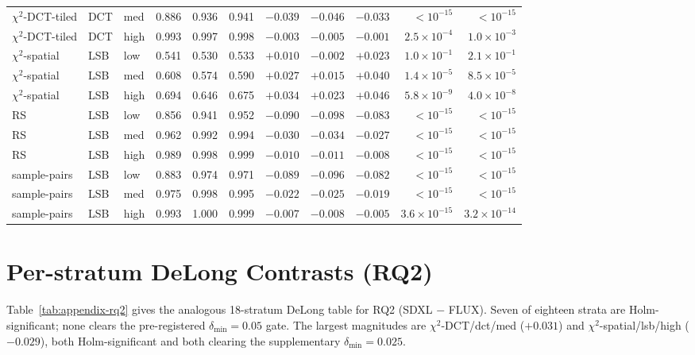 \documentclass[10pt,twocolumn,a4paper]{article}
\begin{document}
\begin{table}[h]
\begin{tabular}{@{}l l l c c c r r r r r@{}}
$\chi^2$-DCT-tiled   & DCT & med    & 0.886 & 0.936 & 0.941 & $-0.039$ & $-0.046$ & $-0.033$ & $<\!10^{-15}$           & $<\!10^{-15}$ \\
$\chi^2$-DCT-tiled   & DCT & high   & 0.993 & 0.997 & 0.998 & $-0.003$ & $-0.005$ & $-0.001$ & $2.5\!\times\!10^{-4}$ & $1.0\!\times\!10^{-3}$ \\
$\chi^2$-spatial     & LSB & low    & 0.541 & 0.530 & 0.533 & $+0.010$ & $-0.002$ & $+0.023$ & $1.0\!\times\!10^{-1}$ & $2.1\!\times\!10^{-1}$ \\
$\chi^2$-spatial     & LSB & med    & 0.608 & 0.574 & 0.590 & $+0.027$ & $+0.015$ & $+0.040$ & $1.4\!\times\!10^{-5}$ & $8.5\!\times\!10^{-5}$ \\
$\chi^2$-spatial     & LSB & high   & 0.694 & 0.646 & 0.675 & $+0.034$ & $+0.023$ & $+0.046$ & $5.8\!\times\!10^{-9}$ & $4.0\!\times\!10^{-8}$ \\
RS                   & LSB & low    & 0.856 & 0.941 & 0.952 & $-0.090$ & $-0.098$ & $-0.083$ & $<\!10^{-15}$           & $<\!10^{-15}$ \\
RS                   & LSB & med    & 0.962 & 0.992 & 0.994 & $-0.030$ & $-0.034$ & $-0.027$ & $<\!10^{-15}$           & $<\!10^{-15}$ \\
RS                   & LSB & high   & 0.989 & 0.998 & 0.999 & $-0.010$ & $-0.011$ & $-0.008$ & $<\!10^{-15}$           & $<\!10^{-15}$ \\
sample-pairs         & LSB & low    & 0.883 & 0.974 & 0.971 & $-0.089$ & $-0.096$ & $-0.082$ & $<\!10^{-15}$           & $<\!10^{-15}$ \\
sample-pairs         & LSB & med    & 0.975 & 0.998 & 0.995 & $-0.022$ & $-0.025$ & $-0.019$ & $<\!10^{-15}$           & $<\!10^{-15}$ \\
sample-pairs         & LSB & high   & 0.993 & 1.000 & 0.999 & $-0.007$ & $-0.008$ & $-0.005$ & $3.6\!\times\!10^{-15}$ & $3.2\!\times\!10^{-14}$ \\
\bottomrule
\end{tabular}
\end{table}

\section{Per-stratum DeLong Contrasts (RQ2)}
\label{app:rq2-delong}
Table~\ref{tab:appendix-rq2} gives the analogous 18-stratum DeLong table for RQ2 (SDXL $-$ FLUX). Seven of eighteen strata are Holm-significant; none clears the pre-registered $\delta_\text{min}\!=\!0.05$ gate. The largest magnitudes are $\chi^2$-DCT/dct/med ($+0.031$) and $\chi^2$-spatial/lsb/high ($-0.029$), both Holm-significant and both clearing the supplementary $\delta_\text{min}\!=\!0.025$.
\end{document}
